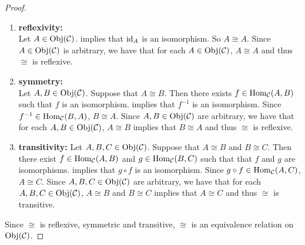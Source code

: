\documentclass{book}
\begin{document}
	\begin{proof} \
		\begin{enumerate}
			\item \textbf{reflexivity: } \\
			Let $A \in \operatorname{Obj}(\mathcal{C})$.  implies that $\operatorname{id}_A$ is an isomorphism. So $A \cong A$. Since $A \in \operatorname{Obj}(\mathcal{C})$ is arbitrary, we have that for each $A \in \operatorname{Obj}(\mathcal{C})$, $A \cong A$ and thus $\cong$ is reflexive. 
			\item \textbf{symmetry: } \\
			Let $A, B \in \operatorname{Obj}(\mathcal{C})$. Suppose that $A \cong B$. Then there exists $f \in \operatorname{Hom}_{\mathcal{C}}(A,B)$ such that $f$ is an isomorphism.  implies that $f^{-1}$ is an isomorphism. Since $f^{-1} \in \operatorname{Hom}_{\mathcal{C}}(B, A)$, $B \cong A$.  Since $A, B \in \operatorname{Obj}(\mathcal{C})$ are arbitrary, we have that for each $A, B \in \operatorname{Obj}(\mathcal{C})$, $A \cong B$ implies that $B \cong A$ and thus $\cong$ is reflexive. 
			\item \textbf{transitivity: }
			Let $A, B, C \in \operatorname{Obj}(\mathcal{C})$. Suppose that $A \cong B$ and $B \cong C$. Then there exist $f \in \operatorname{Hom}_{\mathcal{C}}(A,B)$ and $g \in \operatorname{Hom}_{\mathcal{C}}(B, C)$ such that that $f$ and $g$ are isomorphisms.  implies that $g \circ f$ is an isomorphism. Since $g \circ f \in \operatorname{Hom}_{\mathcal{C}}(A, C)$, $A \cong C$. Since $A, B, C \in \operatorname{Obj}(\mathcal{C})$ are arbitrary, we have that for each $A, B, C \in \operatorname{Obj}(\mathcal{C})$, $A \cong B$ and $B \cong C$ implies that $A \cong C$ and thus $\cong$ is transitive. 
		\end{enumerate}
		Since $\cong$ is reflexive, symmetric and transitive, $\cong$ is an equivalence relation on $\operatorname{Obj}(\mathcal{C})$.
	\end{proof}
	
\end{document}
